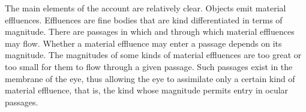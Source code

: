 \documentclass[12pt]{article}
\begin{document}
%     
%     
%     
%     
%     
%     
%     
%     
%     
%     
%     
%     

The main elements of the account are relatively clear. Objects emit material effluences. Effluences are fine bodies that are kind differentiated in terms of magnitude. There are passages in which and through which material effluences may flow. Whether a material effluence may enter a passage depends on its magnitude. The magnitudes of some kinds of material effluences are too great or too small for them to flow through a given passage. Such passages exist in the membrane of the eye, thus allowing the eye to assimilate only a certain kind of material effluence, that is, the kind whose magnitude permits entry in ocular passages.
\end{document}
